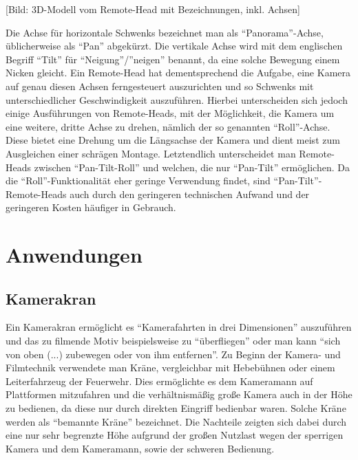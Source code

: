 \documentclass[a4paper, 12pt, bibtotocnumbered, liststotocnumbered]{scrartcl}
\begin{document}
	[Bild: 3D-Modell vom Remote-Head mit Bezeichnungen, inkl. Achsen]

	Die Achse für horizontale Schwenks bezeichnet man als “Panorama”-Achse, üblicherweise als “Pan” abgekürzt. Die vertikale Achse wird mit dem englischen Begriff “Tilt” für “Neigung”/”neigen” benannt, da eine solche Bewegung einem Nicken gleicht.
	Ein Remote-Head hat dementsprechend die Aufgabe, eine Kamera auf genau diesen Achsen ferngesteuert auszurichten und so Schwenks mit unterschiedlicher Geschwindigkeit auszuführen. Hierbei unterscheiden sich jedoch einige Ausführungen von Remote-Heads, mit der Möglichkeit, die Kamera um eine weitere, dritte Achse zu drehen, nämlich der so genannten “Roll”-Achse. Diese bietet eine Drehung um die Längsachse der Kamera und dient meist zum Ausgleichen einer schrägen Montage. Letztendlich unterscheidet man Remote-Heads zwischen “Pan-Tilt-Roll” und welchen, die nur “Pan-Tilt” ermöglichen. Da die “Roll”-Funktionalität eher geringe Verwendung findet, sind “Pan-Tilt”-Remote-Heads auch durch den geringeren technischen Aufwand und der geringeren Kosten häufiger in Gebrauch.

	\section{Anwendungen}
	\subsection{Kamerakran}
	Ein Kamerakran ermöglicht es “Kamerafahrten in drei Dimensionen”\cite{wikipedia-kamerakran} auszuführen und das zu filmende Motiv beispielsweise zu “überfliegen”\cite{wikipedia-kamerakran} oder man kann “sich von oben (...) zubewegen oder von ihm entfernen”\cite{wikipedia-kamerakran}. Zu Beginn der Kamera- und Filmtechnik verwendete man Kräne, vergleichbar mit Hebebühnen oder einem Leiterfahrzeug der Feuerwehr. Dies ermöglichte es dem Kameramann auf Plattformen mitzufahren und die verhältnismäßig große Kamera auch in der Höhe zu bedienen, da diese nur durch direkten Eingriff bedienbar waren. Solche Kräne werden als “bemannte Kräne”\cite{wikipedia-kamerakran} bezeichnet. Die Nachteile zeigten sich dabei durch eine nur sehr begrenzte Höhe aufgrund der großen Nutzlast wegen der sperrigen Kamera und dem Kameramann, sowie der schweren Bedienung.
\end{document}

